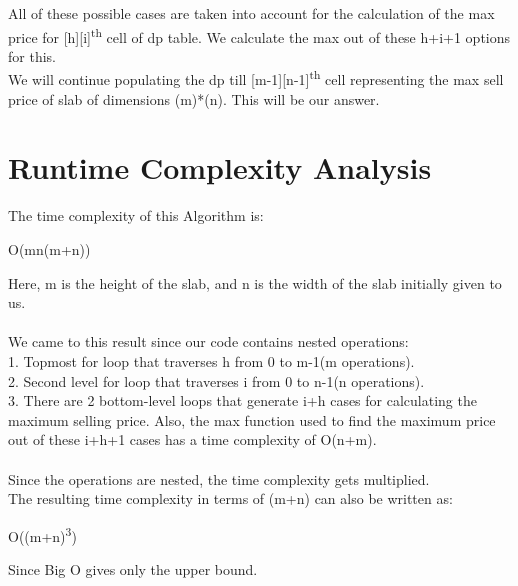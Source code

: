 \documentclass{article}
\begin{document}
All of these possible cases are taken into account for the calculation of the max price for [h][i]\textsuperscript{th} cell of dp table. We calculate the max out of these h+i+1 options for this.\\

We will continue populating the dp till [m-1][n-1]\textsuperscript{th} cell representing the max sell price of slab of dimensions (m)*(n). This will be our answer.
\\

\section{Runtime Complexity Analysis}
The time complexity of this Algorithm is:
\begin{center}
O(mn(m+n))
\end{center}
Here, m is the height of the slab, and n is the width of the slab initially given to us.\\
\\We came to this result since our code contains nested operations:\\
1.  Topmost for loop that traverses h from 0 to m-1(m operations).\\
2.  Second level for loop that traverses i from 0 to n-1(n operations).\\
3.  There are 2 bottom-level loops that generate i+h cases for calculating the maximum selling price. Also, the max function used to find the maximum price out of these i+h+1 cases has a time complexity of O(n+m).\\\\
Since the operations are nested, the time complexity gets multiplied. \\
The resulting time complexity in terms of (m+n) can also be written as:
\begin{center}
O((m+n)\textsuperscript{3})\\
\end{center}
Since Big O gives only the upper bound.
\\\\\\\\\\\\\\\\\\\
\end{document}

